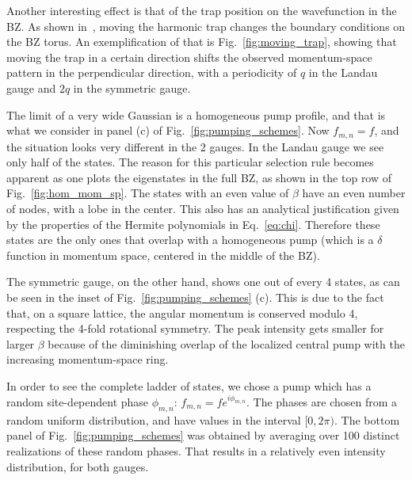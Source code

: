 \documentclass[twocolumn, 10pt, aps, superscriptaddress, floatfix, showpacs, pra, citeautoscript]{revtex4-1}
\newcommand{\co}[2]{#2}
\renewcommand{\paragraph}{\co}
\begin{document}
Another interesting effect is that of the trap position on the
wavefunction in the BZ. As shown in~\cite{ozawa2014momhh}, moving the
harmonic trap changes the boundary conditions on the BZ torus. An
exemplification of that is Fig.~\ref{fig:moving_trap}, showing that
moving the trap in a certain direction shifts the observed
momentum-space pattern in the perpendicular direction, with a
periodicity of $q$ in the Landau gauge and $2q$ in the symmetric
gauge.


\paragraph{Homogeneous spectrum can be understood using a parity argument in momentum space.}
The limit of a very wide Gaussian is a homogeneous pump profile, and
that is what we consider in panel (c) of
Fig.~\ref{fig:pumping_schemes}. Now $f_{m,n} = f$, and the situation
looks very different in the 2 gauges.  In the Landau gauge we see only
half of the states. The reason for this particular selection rule
becomes apparent as one plots the eigenstates in the full BZ, as shown
in the top row of Fig.~\ref{fig:hom_mom_sp}. The states with an even
value of $\beta$ have an even number of nodes, with a lobe in the
center. This also has an analytical justification given by the
properties of the Hermite polynomials in Eq.~\eqref{eq:chi}. Therefore
these states are the only ones that overlap with a homogeneous pump
(which is a $\delta$ function in momentum space, centered in the
middle of the BZ).
%

The symmetric gauge, on the other hand, shows one out of every 4
states, as can be seen in the inset of Fig.~\ref{fig:pumping_schemes}
(c). This is due to the fact that, on a square lattice, the angular
momentum is conserved modulo 4, respecting the 4-fold rotational
symmetry. The peak intensity gets smaller for larger $\beta$ because
of the diminishing overlap of the localized central pump with the
increasing momentum-space ring.

\paragraph{One must use a random phase in order to see all the states.}
In order to see the complete ladder of states, we chose a pump which
has a random site-dependent phase $\phi_{m,n}$:
$f_{m,n}=fe^{i\phi_{m,n}}$.  The phases are chosen from a random
uniform distribution, and have values in the interval $[0,2\pi)$. The
bottom panel of Fig.~\ref{fig:pumping_schemes} was obtained by
averaging over 100 distinct realizations of these random phases. That
results in a relatively even intensity distribution, for both gauges.
\end{document}
